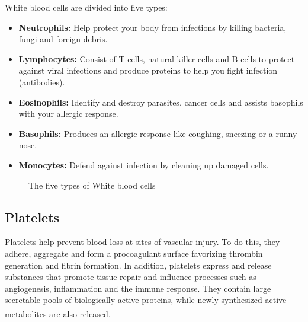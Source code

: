 White blood cells are divided into five types:

\begin{itemize}
  \item \textbf{Neutrophils:} Help protect your body from infections by killing bacteria, fungi and foreign debris.
  \item \textbf{Lymphocytes:} Consist of T cells, natural killer cells and B cells to protect against viral infections and produce proteins to help you fight infection (antibodies).
  \item \textbf{Eosinophils:} Identify and destroy parasites, cancer cells and assists basophils with your allergic response.
  \item \textbf{Basophils:} Produces an allergic response like coughing, sneezing or a runny nose.
  \item \textbf{Monocytes:} Defend against infection by cleaning up damaged cells.
\end{itemize}

\newpage

\begin{figure}[H]
\centering
  \vspace{-0.1in}
    \centerline{}
    \caption{The five types of White blood cells}
\end{figure}

\subsection{Platelets}

Platelets help prevent blood loss at sites of vascular injury. To do this, they adhere, aggregate and form a procoagulant surface favorizing thrombin generation and fibrin formation. In addition, platelets express and release substances that promote tissue repair and influence processes such as angiogenesis, inflammation and the immune response. They contain large secretable pools of biologically active proteins, while newly synthesized active metabolites are also released. \textsuperscript{\cite{nurden2008platelets}}

